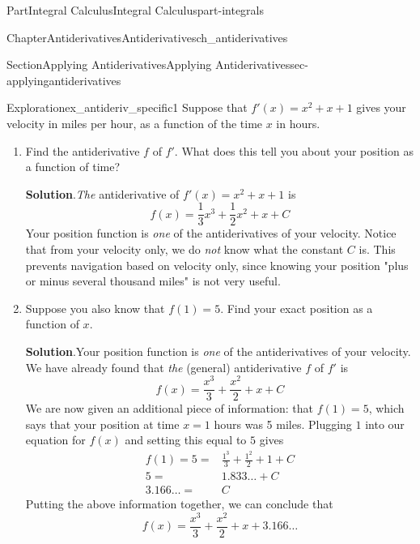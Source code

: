 \documentclass[oneside,10pt,]{tufte-book}
\newcommand{\blocktitlefont}{\relax}
\numberwithin{equation}{chapter}
\newcommand{\amp}{&}
\begin{document}
\begin{partptx}{Part}{Integral Calculus}{}{Integral Calculus}{}{}{part-integrals}
\begin{chapterptx}{Chapter}{Antiderivatives}{}{Antiderivatives}{}{}{ch_antiderivatives}
\begin{sectionptx}{Section}{Applying Antiderivatives}{}{Applying Antiderivatives}{}{}{sec-applyingantiderivatives}
%
\begin{exploration}{Exploration}{}{ex_antideriv_specific1}%
Suppose that \(f'(x) = x^2 + x + 1\) gives your velocity in miles per hour, as a function of the time \(x\) in hours.%
\begin{enumerate}[font=\bfseries,label=(\alph*),ref=\alph*]%
\item{}Find the antiderivative \(f\) of \(f'\).  What does this tell you about your position as a function of time?%
\par\smallskip%
\noindent\textbf{\blocktitlefont Solution}.\hypertarget{ex_antideriv_specific1-2-2}{}\quad{}\emph{The} antiderivative of \(f'(x) = x^2 + x + 1\) is%
\begin{equation*}
f(x) = \frac{1}{3}x^3 + \frac{1}{2} x^2 + x + C
\end{equation*}
Your position function is \emph{one} of the antiderivatives of your velocity. Notice that from your velocity only, we do \emph{not} know what the constant \(C\) is.  This prevents navigation based on velocity only, since knowing your position "plus or minus several thousand miles" is not very useful.%
\item{}Suppose you also know that \(f(1)=5\). Find your exact position as a function of \(x\).%
\par\smallskip%
\noindent\textbf{\blocktitlefont Solution}.\hypertarget{ex_antideriv_specific1-3-2}{}\quad{}Your position function is \emph{one} of the antiderivatives of your velocity. We have already found that \emph{the} (general) antiderivative \(f\) of \(f'\) is%
\begin{equation*}
f(x) = \frac{x^3}{3} + \frac{x^2}{2} + x + C
\end{equation*}
We are now given an additional piece of information: that \(f(1) = 5\), which says that your position at time \(x=1\) hours was 5 miles. Plugging \(1\) into our equation for \(f(x)\) and setting this equal to \(5\) gives%
\begin{align*}
f(1) = 5 = \amp \frac{1^3}{3} + \frac{1^2}{2} + 1 + C \\
5 = \amp 1.833\dots + C\\
3.166\dots = \amp C 
\end{align*}
Putting the above information together, we can conclude that%
\begin{equation*}
f(x) = \frac{x^3}{3} + \frac{x^2}{2} + x + 3.166\dots
\end{equation*}

\end{enumerate}
\end{exploration}
\end{sectionptx}
\end{chapterptx}
\end{partptx}
\end{document}
